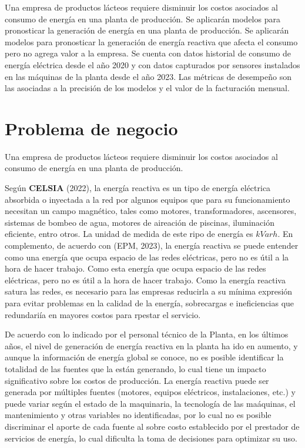 \setlength{\parindent}{15pt} Una empresa de productos l\'acteos requiere disminuir los costos asociados 
al consumo de energ\'ia en una planta de producci\'on. Se aplicar\'an modelos
para pronosticar la generaci\'on de energ\'ia en una planta de producci\'on. Se aplicar\'an 
modelos para pronosticar la generaci\'on de energ\'ia reactiva que afecta el consumo pero no agrega valor
a la empresa. Se cuenta con datos historial de consumo de energ\'ia el\'ectrica desde el a\~no 2020 y con datos
capturados por sensores instalados en las m\'aquinas de la planta desde el a\~no 2023. Las m\'etricas de desempe\~no son las 
asociadas a la precisi\'on de los modelos y el valor de la facturaci\'on mensual.

\section{Problema de negocio}
\setlength{\parindent}{15pt} Una empresa de productos l\'acteos requiere disminuir los costos 
asociados al consumo de energ\'ia en una planta de producci\'on.

Seg\'un \textbf{CELSIA} (2022), la energ\'ia reactiva es un tipo de energ\'ia el\'ectrica absorbida o inyectada a la red por algunos equipos que para su funcionamiento necesitan un campo 
magn\'etico, tales como motores, transformadores, ascensores, sistemas de bombeo de agua, motores de aireaci\'on de piscinas, iluminaci\'on eficiente, entro otros. La unidad de medida 
de este ripo de energ\'ia es $kVarh$. En complemento, de acuerdo con (EPM, 2023), la energ\'ia reactiva se puede entender como una energ\'ia que ocupa espacio de las redes el\'ectricas, pero 
no es \'util a la hora de hacer trabajo. Como esta energ\'ia que ocupa espacio de las redes el\'ectricas, pero no es \'util a la hora de hacer trabajo. Como la energ\'ia reactiva 
satura las redes, es necesario para las empresas reducirla a su m\'inima expresi\'on para evitar problemas en la calidad de la energ\'ia, sobrecargas e ineficiencias que redundari\'ia en mayores 
costos para rpestar el servicio.

De acuerdo con lo indicado por el personal t\'ecnico de la Planta, en los \'ultimos a\~nos, el nivel de generaci\'on de energ\'ia reactiva en la planta ha ido en aumento, y aunque la informaci\'on 
de energ\'ia global se conoce, no es posible identificar la totalidad de las fuentes que la est\'an generando, lo cual tiene un impacto significativo sobre los costos de producci\'on.
La energ\'ia reactiva puede ser generada por m\'ultiples fuentes (motores, equipos el\'ectricos, instalaciones, etc.) y puede variar seg\'un el estado de la maquinaria, la tecnolog\'ia de las ma\'aquinas, 
el mantenimiento y otras variables no identificadas, por lo cual no es posible discriminar el aporte de cada fuente al sobre costo establecido por el prestador de servicios de energ\'ia, lo cual dificulta la toma de decisiones 
para optimizar su uso. 
